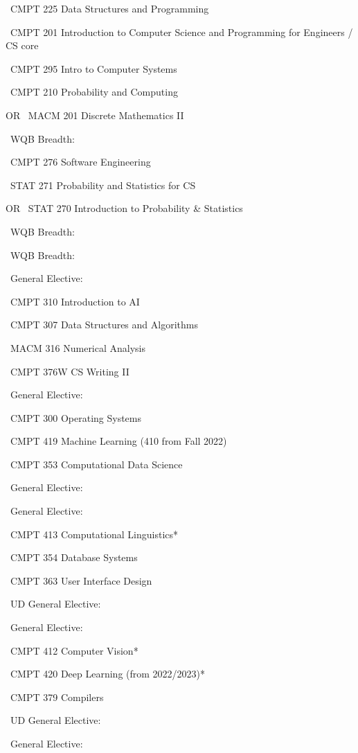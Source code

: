 \documentclass[11pt]{article}
\newcommand{\course}[2]{\Square~#1 #2\par}
\newcommand{\courseonly}[1]{\Square~#1\par}
\newcommand{\YearThreeLeft}{%
  \course{CMPT 310}{Introduction to AI}
  \course{CMPT 307}{Data Structures and Algorithms}
  \course{MACM 316}{Numerical Analysis}
  \course{CMPT 376W}{CS Writing II}
  \courseonly{General Elective: \underline{\hspace{2.7cm}}}
}
\newcommand{\YearThreeRight}{%
  \course{CMPT 300}{Operating Systems}
  \course{CMPT 419}{Machine Learning (410 from Fall 2022)}
  \course{CMPT 353}{Computational Data Science}
  \courseonly{General Elective: \underline{\hspace{2.7cm}}}
  \courseonly{General Elective: \underline{\hspace{2.7cm}}}
}
\newcommand{\YearFourLeft}{%
  \course{CMPT 413}{Computational Linguistics*}
  \course{CMPT 354}{Database Systems}
  \course{CMPT 363}{User Interface Design}
  \courseonly{UD General Elective: \underline{\hspace{2cm}}}
  \courseonly{General Elective: \underline{\hspace{2.2cm}}}
}
\newcommand{\YearFourRight}{%
  \course{CMPT 412}{Computer Vision*}
  \course{CMPT 420}{Deep Learning (from 2022/2023)*}
  \course{CMPT 379}{Compilers}
  \courseonly{UD General Elective: \underline{\hspace{2cm}}}
  \courseonly{General Elective: \underline{\hspace{2.2cm}}}
}
\begin{document}
\begin{tcolorbox}[colback=white, colframe=black, boxrule=0.8pt, title=Year 2,
  fonttitle=\bfseries, coltitle=black, colbacktitle=sfugray, left=6pt, right=6pt]
\begin{minipage}[t]{0.48\textwidth}
\course{CMPT 225}{Data Structures and Programming}
\course{CMPT 201}{Introduction to Computer Science and Programming for Engineers / CS core}
\course{CMPT 295}{Intro to Computer Systems}
\course{CMPT 210}{Probability and Computing}
OR \course{MACM 201}{Discrete Mathematics II}
\courseonly{WQB Breadth: \underline{\hspace{2.5cm}}}
\end{minipage}%
\hfill
\begin{minipage}[t]{0.48\textwidth}
\course{CMPT 276}{Software Engineering}
\course{STAT 271}{Probability and Statistics for CS}
OR \course{STAT 270}{Introduction to Probability \& Statistics}
\courseonly{WQB Breadth: \underline{\hspace{2.5cm}}}
\courseonly{WQB Breadth: \underline{\hspace{2.5cm}}}
\courseonly{General Elective: \underline{\hspace{2.2cm}}}
\end{minipage}
\end{tcolorbox}

\begin{tcolorbox}[colback=white, colframe=black, boxrule=0.8pt, title=Year 3,
  fonttitle=\bfseries, coltitle=black, colbacktitle=sfugray, left=6pt, right=6pt]
\begin{minipage}[t]{0.48\textwidth}
\YearThreeLeft
\end{minipage}%
\hfill
\begin{minipage}[t]{0.48\textwidth}
\YearThreeRight
\end{minipage}
\end{tcolorbox}

\begin{tcolorbox}[colback=white, colframe=black, boxrule=0.8pt, title=Year 4,
  fonttitle=\bfseries, coltitle=black, colbacktitle=sfugray, left=6pt, right=6pt]
\begin{minipage}[t]{0.48\textwidth}
\YearFourLeft
\end{minipage}%
\hfill
\begin{minipage}[t]{0.48\textwidth}
\YearFourRight
\end{minipage}
\end{tcolorbox}
\end{document}
